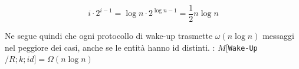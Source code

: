  $$i \cdot 2^{i-1} = \log n \cdot 2^{\log n-1} = {\frac{1}{2}} n \log n$$
 
 Ne segue quindi che ogni protocollo di wake-up trasmette $\omega(n \log n)$ messaggi nel peggiore dei casi, anche se le entità hanno id distinti. : $M[$\texttt{Wake-Up}$/R;k;id] = \Omega(n \log n)$


